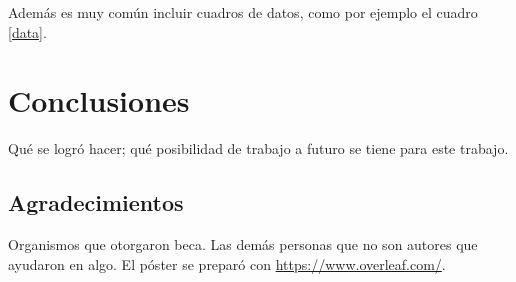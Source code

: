 \documentclass[a0]{sciposter} %
\begin{document}
\begin{multicols}{2}
Además es muy común incluir cuadros de datos, como por ejemplo el cuadro \ref{data}.

\begin{table}
\setcounter{table}{0} %
\captionsetup{type=table} %
\caption{Aquí explicas cómo interpreta el cuadro.}
\label{data}
\begin{center}
\end{center}
\end{table}

\section{Conclusiones}

Qué se logró hacer; qué posibilidad de trabajo a futuro se tiene para
este trabajo.

\subsection*{Agradecimientos}

Organismos que otorgaron beca. Las demás personas que no son autores
que ayudaron en algo. El póster se preparó con
\url{https://www.overleaf.com/}.

\end{multicols}



\end{document}
